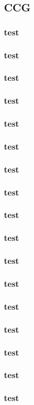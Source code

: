 \documentclass{beamer}
\begin{document}
\subsection{CCG}

\begin{frame}
    \frametitle{test}
\end{frame}

\begin{frame}
    \frametitle{test}
\end{frame}

\begin{frame}
    \frametitle{test}
\end{frame}

\begin{frame}
    \frametitle{test}
\end{frame}

\begin{frame}
    \frametitle{test}
\end{frame}

\begin{frame}
    \frametitle{test}
\end{frame}

\begin{frame}
    \frametitle{test}
\end{frame}

\begin{frame}
    \frametitle{test}
\end{frame}

\begin{frame}
    \frametitle{test}
\end{frame}

\begin{frame}
    \frametitle{test}
\end{frame}

\begin{frame}
    \frametitle{test}
\end{frame}

\begin{frame}
    \frametitle{test}
\end{frame}

\begin{frame}
    \frametitle{test}
\end{frame}

\begin{frame}
    \frametitle{test}
\end{frame}

\begin{frame}
    \frametitle{test}
\end{frame}

\begin{frame}
    \frametitle{test}
\end{frame}

\begin{frame}
    \frametitle{test}
\end{frame}
\end{document}
